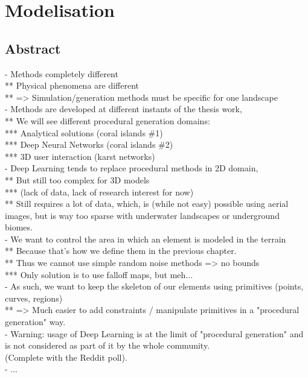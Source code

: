 \part{Modelisation}

\chapter*{Abstract}
\label{chap:modelisation-abstract}
- Methods completely different \\
** Physical phenomena are different \\
** => Simulation/generation methods must be specific for one landscape \\
- Methods are developed at different instants of the thesis work, \\
** We will see different procedural generation domains: \\
*** Analytical solutions (coral islands \#1) \\
*** Deep Neural Networks (coral islands \#2) \\
*** 3D user interaction (karst networks) \\
- Deep Learning tends to replace procedural methods in 2D domain, \\
** But still too complex for 3D models \\
*** (lack of data, lack of research interest for now) \\
** Still requires a lot of data, which, is (while not easy) possible using aerial images, but is way too sparse with underwater landscapes or underground biomes. \\
- We want to control the area in which an element is modeled in the terrain \\
** Because that's how we define them in the previous chapter. \\
** Thus we cannot use simple random noise methods => no bounds \\
*** Only solution is to use falloff maps, but meh... \\
- As such, we want to keep the skeleton of our elements using primitives (points, curves, regions) \\
** => Much easier to add constraints / manipulate primitives in a "procedural generation" way. \\
- Warning: usage of Deep Learning is at the limit of "procedural generation" and is not considered as part of it by the whole community. \\
(Complete with the Reddit poll). \\
- ... 




% 



